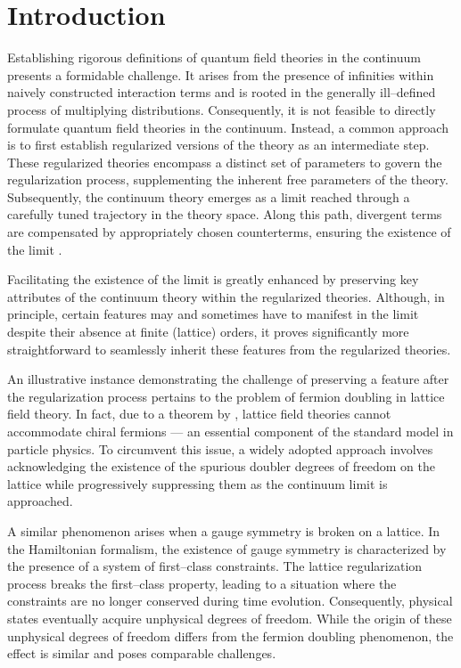 \section{Introduction}
Establishing rigorous definitions of quantum field theories in the continuum presents a formi\-dable challenge.
It arises from the presence of infinities within naively constructed interaction terms and is rooted in the generally ill--defined process of multiplying distributions. 
Consequently, it is not feasible to directly formulate quantum field theories in the continuum. 
Instead, a common approach is to first establish regularized versions of the theory as an intermediate step. 
These regularized theories encompass a distinct set of parameters to govern the regularization process, supplementing the inherent free parameters of the theory. 
Subsequently, the continuum theory emerges as a limit reached through a carefully tuned trajectory in the theory space. Along this path, divergent terms are compensated by appropriately chosen counterterms, ensuring the existence of the limit \parencite{Montvay:1994cy}.

Facilitating the existence of the limit is greatly enhanced by preserving key attributes of the continuum theory within the regularized theories.
Although, in principle, certain features may and sometimes have to manifest in the limit despite their absence at finite (lattice) orders, it proves significantly more straightforward to seamlessly inherit these features from the regularized theories. 

An illustrative instance demonstrating the challenge of preserving a feature after the regularization process pertains to the problem of fermion doubling in lattice field theory. 
In fact, due to a theorem by \textcite{Nielsen:1981hk}, lattice field theories cannot accommodate chiral fermions --- an essential component of the standard model in particle physics. 
To circumvent this issue, a widely adopted approach involves acknowledging the existence of the spurious doubler degrees of freedom on the lattice while progressively suppressing them as the continuum limit is approached. 

A similar phenomenon arises when a gauge symmetry is broken on a lattice. 
In the Hamiltonian formalism, the existence of gauge symmetry is characterized by the presence of a system of first--class constraints. 
The lattice regularization process breaks the first--class property, leading to a situation where the constraints are no longer conserved during time evolution. 
Consequently, physical states eventually acquire unphysical degrees of freedom. 
While the origin of these unphysical degrees of freedom differs from the fermion doubling phenomenon, the effect is similar and poses comparable challenges. 

